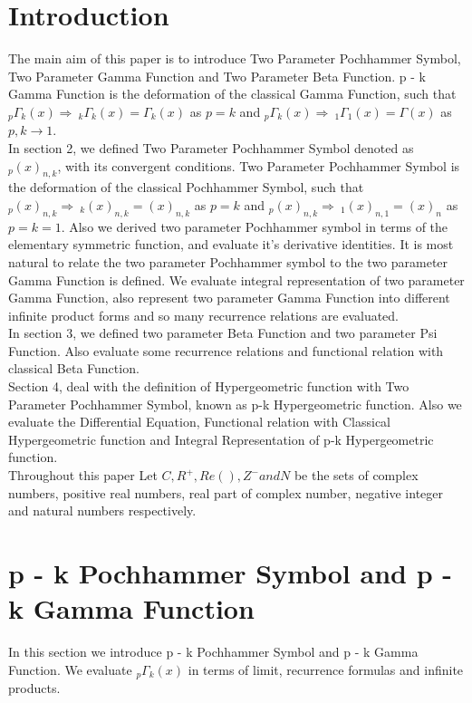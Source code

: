 \documentclass[11pt,a4paper]{article}
\numberwithin{equation}{section}
\begin{document}
\section{Introduction}
The main aim of this paper is to introduce Two Parameter Pochhammer Symbol, Two Parameter Gamma Function and Two Parameter Beta Function. p - k Gamma Function is the deformation of the classical Gamma Function, such that          
$ _{p}\Gamma_{k}(x) \Rightarrow\: _{k}\Gamma_{k}(x) = \Gamma_{k}(x)  $ as $ p = k $ and $ _{p}\Gamma_{k}(x) \Rightarrow \:_{1}\Gamma_{1}(x)= \Gamma (x)  $ as $ p,k\rightarrow 1 $.\\
In section 2, we defined Two Parameter Pochhammer Symbol denoted as $ _{p}(x)_{n,k} $, with its convergent conditions. Two Parameter Pochhammer Symbol is the deformation of the classical Pochhammer Symbol, such that $ _{p}(x)_{n,k} \Rightarrow  \: _{k}(x)_{n,k} = (x)_{n,k}  $ as $ p=k $ and  $ _{p}(x)_{n,k} \Rightarrow  \:  _{1}(x)_{n,1} = (x)_{n}  $ as $ p=k=1. $  Also we derived two parameter Pochhammer symbol  in terms of the elementary symmetric function, and evaluate it's derivative identities. It is most natural to relate the two parameter Pochhammer symbol to the two parameter Gamma Function is defined. We evaluate integral representation of two parameter Gamma Function, also represent two parameter Gamma Function  into different infinite product forms and so many recurrence relations are evaluated. \\
In section 3, we defined two parameter Beta Function and two parameter Psi Function. Also evaluate some recurrence relations and functional relation with classical Beta Function.\\
Section 4, deal with the definition of Hypergeometric function with Two Parameter Pochhammer Symbol, known as p-k Hypergeometric function. Also we evaluate the Differential Equation, Functional relation with Classical Hypergeometric function and Integral Representation of p-k Hypergeometric function.\\
Throughout this paper Let $ C,R^{+}, Re(),Z^{-} and N $ be the sets of complex numbers, positive real numbers, real part of complex number, negative integer and natural numbers respectively. 
\section{p - k Pochhammer Symbol and p - k Gamma Function }
In this section we introduce p - k Pochhammer Symbol and p - k Gamma Function. We evaluate $ _{p}\Gamma_{k}(x) $ in terms of limit, recurrence formulas and infinite products. 
\end{document}
